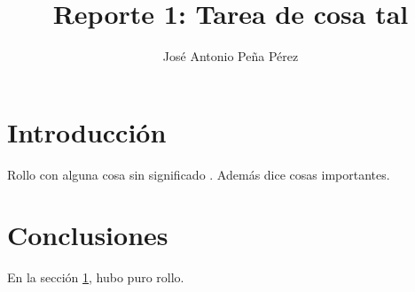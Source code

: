 \documentclass{article}
\title{Reporte 1: Tarea de cosa tal}
\author{Jos\'{e} Antonio Pe\~{n}a P\'{e}rez}
\begin{document}
\maketitle

\section{Introducci\'{o}n}\label{intro}

Rollo con alguna cosa sin significado \citep{libro}.
Adem\'{a}s \citet{art} dice cosas importantes.

\section{Conclusiones}

En la secci\'{o}n \ref{intro}, hubo puro rollo.



\end{document}
